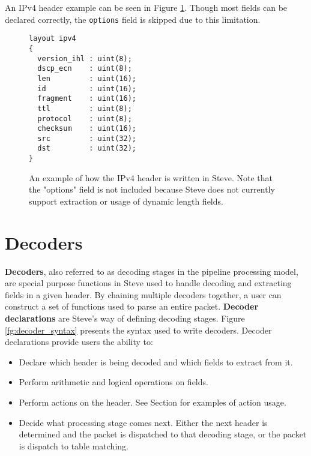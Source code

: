 An IPv4 header example can be seen in Figure \ref{fg:ipv4_layout_ex}. Though most fields can be declared correctly, the \texttt{options} field is skipped due to this limitation.

\begin{figure}
\begin{lstlisting}
layout ipv4
{
  version_ihl : uint(8);
  dscp_ecn    : uint(8);
  len         : uint(16);
  id          : uint(16);
  fragment    : uint(16);
  ttl         : uint(8);
  protocol    : uint(8);
  checksum    : uint(16);
  src         : uint(32);
  dst         : uint(32);
}
\end{lstlisting}
\caption{An example of how the IPv4 header is written in Steve. Note that the "options" field is not included because Steve does not currently support extraction or usage of dynamic length fields.}
\label{fg:ipv4_layout_ex}
\end{figure}

\section{Decoders} \label{decoder_tut}

\textbf{Decoders}, also referred to as decoding stages in the pipeline processing model,  are special purpose functions in Steve used to handle decoding and extracting fields in a given header. By chaining multiple decoders together, a user can construct a set of functions used to parse an entire packet. \textbf{Decoder declarations} are Steve's way of defining decoding stages. Figure \ref{fg:decoder_syntax} presents the syntax used to write decoders. Decoder declarations provide users the ability to:

\begin{itemize}
\item Declare which header is being decoded and which fields to extract from it.
\item Perform arithmetic and logical operations on fields.
\item Perform actions on the header. See Section \label{action_tut} for examples of action usage.
\item Decide what processing stage comes next. Either the next header is determined and the packet is dispatched to that decoding stage, or the packet is dispatch to table matching.
\end{itemize}

